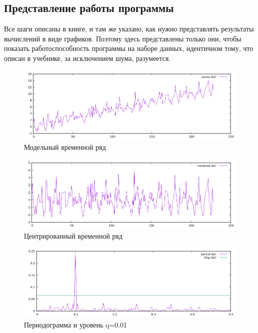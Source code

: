 \documentclass[12pt]{article}
\begin{document}
	\subsection*{Представление работы программы}
	
	Все шаги описаны в книге, и там же указано, как нужно представлять результаты вычислений в виде графиков. Поэтому здесь представлены только они, чтобы показать работоспособность программы на наборе данных, идентичном тому, что описан в учебнике, за исключением шума, разумеется.
	
		\begin{figure}[h]
			\centering
			\includegraphics[width=14cm]{justseries.png} 
			\caption{Модельный временной ряд} 
			\label{fig.0} 
		\end{figure}
		
		\begin{figure}[h]
			\centering
			\includegraphics[width=14cm]{centered.png} 
			\caption{Центрированный временной ряд} 
			\label{fig.0} 
		\end{figure}			

		\begin{figure}[h]
			\centering
			\includegraphics[width=13cm]{period.png} 
			\caption{Периодограмма и уровень q=0.01} 
			\label{fig.0} 
		\end{figure}
	
\end{document}
